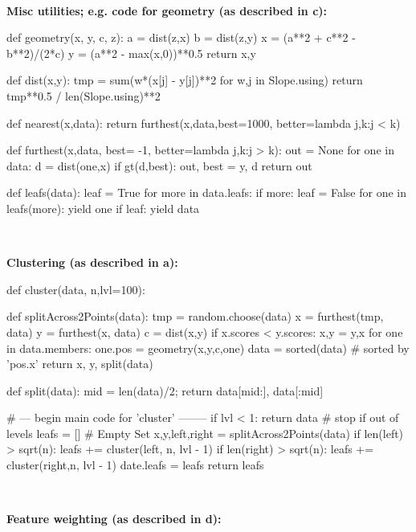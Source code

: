 \begin{figure*}
\begin{minipage}[t]{.45\linewidth}
~~

{\bf Misc utilities; e.g. code for geometry (as described in c):}

 
\begin{python}[left]
def geometry(x, y, c, z): 
  a = dist(z,x)
  b = dist(z,y) 
  x = (a**2 + c**2 - b**2)/(2*c) 
  y = (a**2 - max(x,0))**0.5
  return x,y

def dist(x,y):
   tmp = sum(w*(x[j] - y[j])**2 for w,j in Slope.using) 
   return tmp**0.5 / len(Slope.using)**2
   
def nearest(x,data):
  return furthest(x,data,best=1000,
                    better=lambda j,k:j < k)
 
def furthest(x,data, best= -1, 
                     better=lambda j,k:j > k):  
  out = None
  for one in data:
    d = dist(one,x)
    if gt(d,best): out, best = y, d
  return out

def leafs(data):
  leaf = True
  for more in data.leafs:
    if more:
       leaf = False
       for one in leafs(more):
         yield one
  if leaf: 
    yield data
\end{python}
 \end{minipage}~~~~~~~~~\begin{minipage}[t]{.45\linewidth} 
\scriptsize\vspace{1mm}
{\bf Clustering (as described in a):}
\begin{python}[right]
def cluster(data, n,lvl=100):

  def splitAcross2Points(data): 
    tmp = random.choose(data)
    x = furthest(tmp, data)
    y = furthest(x, data) 
    c = dist(x,y)  
    if x.scores < y.scores:
      x,y = y,x 
    for one in data.members: 
      one.pos = geometry(x,y,c,one)
    data = sorted(data) # sorted by 'pos.x'
    return x, y, split(data)
  
  def split(data):   
    mid = len(data)/2; 
    return data[mid:], data[:mid]
    
  # --- begin main code for  'cluster' --------
  if lvl < 1: 
     return data # stop if out of levels
  leafs = [] # Empty Set
  x,y,left,right = splitAcross2Points(data) 
  if len(left) > sqrt(n):  
     leafs += cluster(left, n, lvl - 1)  
  if len(right) > sqrt(n):
     leafs += cluster(right,n,  lvl - 1) 
  date.leafs = leafs
  return leafs
\end{python} 

~~

{\bf Feature weighting  (as described in d):}


\end{minipage}
\end{figure*}
